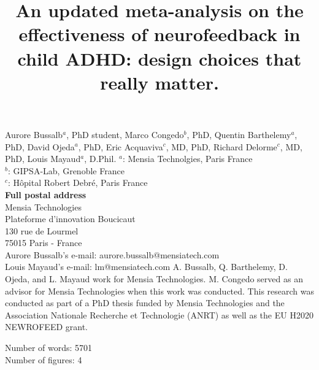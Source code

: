

\title{An updated meta-analysis on the effectiveness of neurofeedback in child ADHD: design choices that really matter.} %
\maketitle
\noindent Aurore Bussalb$^a$, PhD student, Marco Congedo$^b$, PhD, Quentin Barthelemy$^a$, PhD, David Ojeda$^a$, PhD, 
Eric Acquaviva$^c$, MD, PhD, Richard Delorme$^c$, MD, PhD, Louis Mayaud$^a$, D.Phil. 
\smallbreak
\noindent $^a$: Mensia Technolgies, Paris France \\
\noindent $^b$: GIPSA-Lab, Grenoble France \\
\noindent $^c$: Hôpital Robert Debré, Paris France \\ 
\smallbreak
\noindent\textbf{Full postal address} \\
Mensia Technologies \\
Plateforme d'innovation Boucicaut \\
130 rue de Lourmel \\
75015 Paris - France \\
Aurore Bussalb's e-mail: aurore.bussalb@mensiatech.com \\
Louis Mayaud's e-mail: lm@mensiatech.com 
\smallbreak
A. Bussalb, Q. Barthelemy, D. Ojeda, and L. Mayaud work for Mensia Technologies.
M. Congedo served as an advisor for Mensia Technologies when this work was conducted. 
\smallbreak
This research was conducted as part of a PhD thesis funded by Mensia Technologies and the Association Nationale 
Recherche et Technologie (ANRT) as well as the EU H2020 NEWROFEED grant.

Number of words: 5701 \\
Number of figures: 4 
